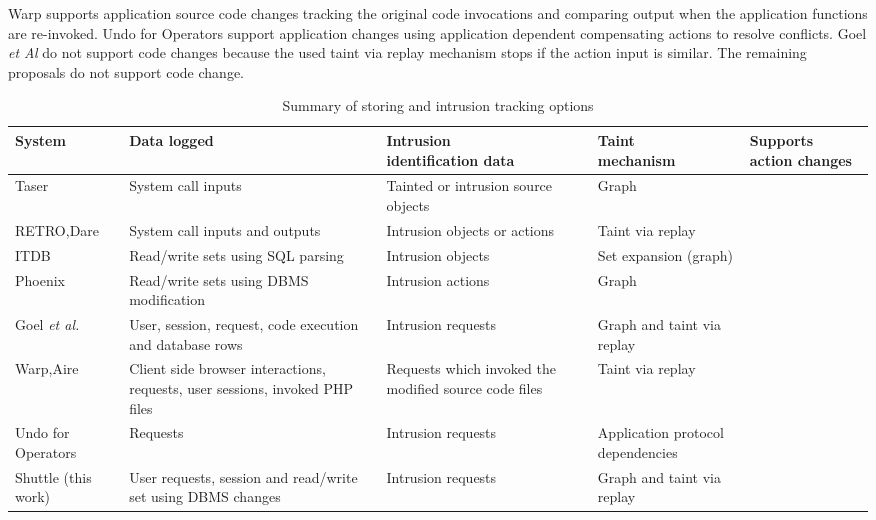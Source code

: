 Warp \cite{warp} supports application source code changes tracking the original code invocations and comparing output when the application functions are re-invoked. Undo for Operators \cite{undoForOperators} support application changes using application dependent compensating actions to resolve conflicts. Goel \textit{et Al} \cite{Akkus2010} do not support code changes because the used taint via replay mechanism stops if the action input is similar. The remaining proposals do not support code change. 


\begin{center}
\begin{table}[h]
  \hspace*{-2cm}
\begin{tabular}{|l|m{4.5cm}|m{3cm}|m{3cm}|C{1.8cm}|}
\hline
\textbf{System} & \textbf{Data logged}		& \textbf{Intrusion \newline identification data} & \textbf{Taint \newline mechanism} & \textbf{Supports action changes} \\ \hline
\cite{taser}Taser			  		& System call inputs 			& Tainted or intrusion source objects 	&Graph						& \xmark		\\ \hline
\cite{retro} \cite{dare} RETRO,Dare	& System call inputs and outputs	& Intrusion objects or actions   &Taint via replay				& \xmark		\\ \hline
\cite{itdb} ITDB						& Read/write sets using SQL parsing & Intrusion objects &Set expansion (graph)		& \xmark \\ \hline
\cite{phoenix} Phoenix					& Read/write sets using DBMS modification & Intrusion actions & Graph 				& \xmark		\\ \hline
\cite{Akkus2010} Goel \textit{et al.}	& User, session, request, code execution and database rows 		&  Intrusion requests &  Graph and taint via replay & \xmark \\ \hline
\cite{warp} \cite{aire} Warp,Aire		& Client side browser interactions, requests, user sessions, invoked PHP files &Requests which invoked the modified source code files & Taint via replay & \cmark	\\ \hline
\cite{undoForOperators} Undo for Operators	&Requests		&Intrusion requests        &Application protocol dependencies   &	\cmark		\\ \hline
Shuttle	(this work)							& User requests, session and read/write set using DBMS changes & Intrusion requests  & Graph and taint via replay & \cmark \\ \hline

\end{tabular}
 \caption{Summary of storing and intrusion tracking options}
  \label{tab:storingTracking}
\end{table}
\end{center}


